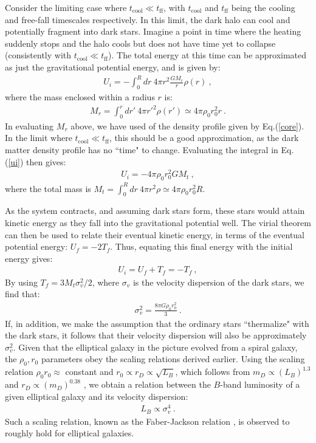 \documentclass[12pt]{article}
\begin{document}
{{Consider the limiting case where $t _{\text{cool}} \ll t _{\text{ff}}$, with $t _{\text{cool}}$ and $t _{\text{ff}}$ being the cooling and free-fall timescales respectively. In this limit, the dark halo can cool and potentially fragment into dark stars. Imagine a point in time where the heating suddenly stops and the halo cools but does not have time yet to collapse (consistently with $t _{\text{cool}} \ll t _{\text{ff}}$). The total energy at this time can be approximated as just the gravitational potential energy, and is given by:
%
\begin{eqnarray}
U _i = -\int _0 ^R dr \ 4\pi r^2 \frac{GM_r}{r}\rho (r) \ ,
\label{ui}
\end{eqnarray}
%
where the mass enclosed within a radius $r$ is:
%
\begin{eqnarray}
M_r = \int _0 ^r dr' \ 4\pi {r'} ^2\rho (r') \simeq 4\pi \rho _0r _0 ^2 r \ .
\end{eqnarray}
%
In evaluating $M_r$ above, we have used of the density profile given by Eq.(\ref{core}).  In the limit where $t _{\text{cool}} \ll t _{\text{ff}}$, this should be a good approximation, as the dark matter density profile has no ``time" to change. Evaluating the integral in Eq.(\ref{ui}) then gives:
%
\begin{eqnarray}
U _i = -4\pi \rho _0r _0 ^2 GM _t \ ,
\end{eqnarray}
%
where the total mass is $M _t = \int _0 ^R dr \ 4\pi r ^2 \rho \simeq 4\pi \rho _0r _0 ^2R$. 

As the system contracts, and assuming dark stars form, these stars would attain kinetic energy as they fall into the gravitational potential well. The virial theorem can then be used to relate their eventual kinetic energy, in terms of the eventual potential energy: $U _f = -2T _f$. Thus, equating this final energy with the initial energy gives:
%
\begin{eqnarray}
U _i = U _f + T _f = -T _f \ ,
\end{eqnarray}
%
By using $T _f = 3M _t\sigma _v ^2/2$, where $\sigma_v$ is the velocity dispersion of the dark stars, we find that:
\begin{eqnarray}
\sigma _v ^2 = \frac{8\pi G\rho _0r _0 ^2}{3} \ .
\end{eqnarray}
%
If, in addition, we make the assumption that the ordinary stars ``thermalize" with the dark stars, it follows that their velocity dispersion will also be approximately $\sigma _v ^2$. Given that the elliptical galaxy in the picture evolved from a spiral galaxy, the $\rho_0, r_0$ parameters obey the scaling relations derived earlier. Using the scaling relation $\rho _0r _0 \approx$ constant and $r _0 \propto r _D \propto \sqrt{L _B}$, which follows from $m _D \propto \left ( L _B \right ) ^{1.3}$ \cite{shankar} and $r_D \propto \left ( m _D \right ) ^{0.38}$ \cite{saluccird}, we obtain a relation between the $B$-band luminosity of a given elliptical galaxy and its velocity dispersion:
%
\begin{eqnarray}
L _B \propto \sigma _v ^4 \ .
\end{eqnarray}
%
Such a scaling relation, known as the Faber-Jackson relation \cite{faberjackson}, is observed to roughly hold for elliptical galaxies.

}}
\end{document}

